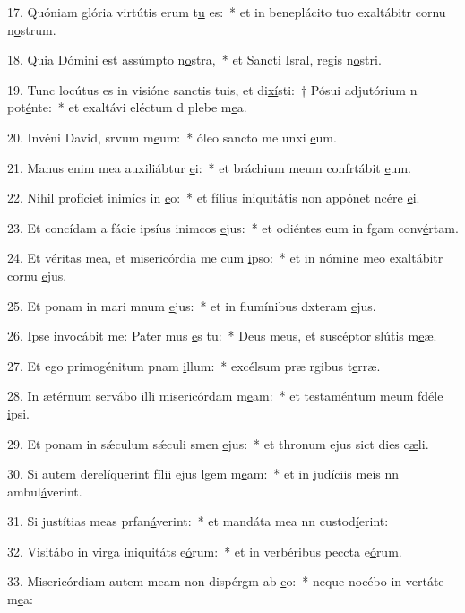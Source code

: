 17. Quóniam glória virtútis erum t\uline{u} es:~* et in beneplácito tuo exaltábitr cornu n\uline{o}strum.\par 
18. Quia Dómini est assúmpto n\uline{o}stra,~* et Sancti Isral, regis n\uline{o}stri.\par 
19. Tunc locútus es in visióne sanctis tuis, et di\uline{xí}sti:~† Pósui adjutórium n pot\uline{é}nte:~* et exaltávi eléctum d plebe m\uline{e}a.\par 
20. Invéni David, srvum m\uline{e}um:~* óleo sancto me unxi \uline{e}um.\par 
21. Manus enim mea auxiliábtur \uline{e}i:~* et bráchium meum confrtábit \uline{e}um.\par 
22. Nihil profíciet inimícs in \uline{e}o:~* et fílius iniquitátis non appónet ncére \uline{e}i.\par 
23. Et concídam a fácie ipsíus inimcos \uline{e}jus:~* et odiéntes eum in fgam conv\uline{é}rtam.\par 
24. Et véritas mea, et misericórdia me cum \uline{i}pso:~* et in nómine meo exaltábitr cornu \uline{e}jus.\par 
25. Et ponam in mari mnum \uline{e}jus:~* et in flumínibus dxteram \uline{e}jus.\par 
26. Ipse invocábit me: Pater mus \uline{e}s tu:~* Deus meus, et suscéptor slútis m\uline{e}æ.\par 
27. Et ego primogénitum pnam \uline{i}llum:~* excélsum præ rgibus t\uline{e}rræ.\par 
28. In ætérnum servábo illi misericórdam m\uline{e}am:~* et testaméntum meum fdéle \uline{i}psi.\par 
29. Et ponam in sǽculum sǽculi smen \uline{e}jus:~* et thronum ejus sict dies c\uline{æ}li.\par 
30. Si autem derelíquerint fílii ejus lgem m\uline{e}am:~* et in judíciis meis nn ambul\uline{á}verint.\par 
31. Si justítias meas prfan\uline{á}verint:~* et mandáta mea nn custod\uline{í}erint:\par 
32. Visitábo in virga iniquitáts e\uline{ó}rum:~* et in verbéribus peccta e\uline{ó}rum.\par 
33. Misericórdiam autem meam non dispérgm ab \uline{e}o:~* neque nocébo in vertáte m\uline{e}a:\par 
